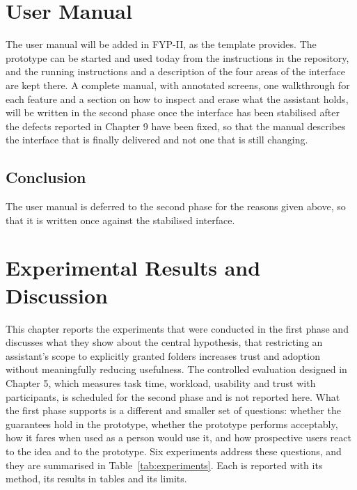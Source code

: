 \documentclass{FastFyp}
\begin{document}
\chapter{User Manual}
The user manual will be added in FYP-II, as the template provides. The prototype can be started and used today from the instructions in the repository, and the running instructions and a description of the four areas of the interface are kept there. A complete manual, with annotated screens, one walkthrough for each feature and a section on how to inspect and erase what the assistant holds, will be written in the second phase once the interface has been stabilised after the defects reported in Chapter 9 have been fixed, so that the manual describes the interface that is finally delivered and not one that is still changing.

\section{Conclusion}
The user manual is deferred to the second phase for the reasons given above, so that it is written once against the stabilised interface.

\chapter{Experimental Results and Discussion}
This chapter reports the experiments that were conducted in the first phase and discusses what they show about the central hypothesis, that restricting an assistant's scope to explicitly granted folders increases trust and adoption without meaningfully reducing usefulness. The controlled evaluation designed in Chapter 5, which measures task time, workload, usability and trust with participants, is scheduled for the second phase and is not reported here. What the first phase supports is a different and smaller set of questions: whether the guarantees hold in the prototype, whether the prototype performs acceptably, how it fares when used as a person would use it, and how prospective users react to the idea and to the prototype. Six experiments address these questions, and they are summarised in Table~\ref{tab:experiments}. Each is reported with its method, its results in tables and its limits.
\end{document}
